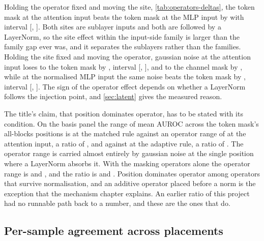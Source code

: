 \documentclass[../main.tex]{subfiles}
\begin{document}
Holding the operator fixed and moving the site, \cref{tab:operators-deltas}, the token mask at the attention input beats the token mask at the MLP input by \AttentionInputMinusMlpInputTokenMask{} with interval [\AttentionInputMinusMlpInputTokenMaskLow{}, \AttentionInputMinusMlpInputTokenMaskHigh{}]. Both sites are sublayer inputs and both are followed by a LayerNorm, so the site effect within the input-side family is larger than the family gap ever was, and it separates the sublayers rather than the families. Holding the site fixed and moving the operator, gaussian noise at the attention input loses to the token mask by \GaussianMinusTokenMaskAttentionNorm{}, interval [\GaussianMinusTokenMaskAttentionNormLow{}, \GaussianMinusTokenMaskAttentionNormHigh{}], and to the channel mask by \GaussianMinusChannelMaskAttentionNorm{}, while at the normalised MLP input the same noise beats the token mask by \GaussianMinusTokenMaskMlp{}, interval [\GaussianMinusTokenMaskMlpLow{}, \GaussianMinusTokenMaskMlpHigh{}]. The sign of the operator effect depends on whether a LayerNorm follows the injection point, and \cref{sec:latent} gives the measured reason.




The title's claim, that position dominates operator, has to be stated with its condition. On the basis panel the range of mean AUROC across the token mask's all-blocks positions is \PositionRangeTokenMaskMatched{} at the matched rule against an operator range of \OperatorRangeAttentionNormMatched{} at the attention input, a ratio of \PositionOverOperatorRatioMatched{}, and \PositionRangeTokenMaskAdaptive{} against \OperatorRangeAttentionNormAdaptive{} at the adaptive rule, a ratio of \PositionOverOperatorRatioAdaptive{}. The operator range is carried almost entirely by gaussian noise at the single position where a LayerNorm absorbs it. With the masking operators alone the operator range is \OperatorRangeAttentionNormMasksMatched{} and \OperatorRangeAttentionNormMasksAdaptive{}, and the ratio is \PositionOverOperatorRatioMasksMatched{} and \PositionOverOperatorRatioMasksAdaptive{}. Position dominates operator among operators that survive normalisation, and an additive operator placed before a norm is the exception that the mechanism chapter explains. An earlier ratio of this project had no runnable path back to a number, and these are the ones that do.

\subsection{Per-sample agreement across placements}
\end{document}
